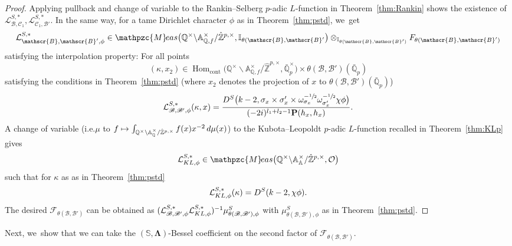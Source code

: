 \documentclass[10pt]{amsart}
\newcommand{\ie}{i.e.}
\newcommand\mto{\mathchoice{\longmapsto}{\mapsto}{\mapsto}{\mapsto}}
\newcommand{\Lfunction}{$L$\nobreakdash-func\-tion\xspace}
\theoremstyle{plain}
\theoremstyle{remark}
\newcommand{\bA}{\mathbb{A}}
\newcommand{\bI}{\mathbb{I}}
\newcommand{\bQ}{\mathbb{Q}}
\newcommand{\bS}{\mathbb{S}}
\newcommand{\bZ}{\mathbb{Z}}
\newcommand{\cF}{\mathcal{F}}
\newcommand{\cL}{\mathcal{L}}
\newcommand{\cO}{\mathcal{O}}
\newcommand{\sB}{\mathscr{B}}
\newcommand{\sC}{\mathscr{C}}
\newcommand{\bfP}{\mathbf{P}}
\newcommand{\Meas}{\mathpzc{M}\mkern-2mu eas}
\newcommand{\cont}{\mathrm{cont}}
\DeclareMathOperator{\Hom}{Hom}
\newcommand{\bLam}{\boldsymbol\Lambda}
\begin{document}
\begin{proof}
Applying pullback and change of variable to the Rankin--Selberg $p$-adic \Lfunction in Theorem~\ref{thm:Rankin} shows the existence of $\cL^{S,*}_{\sB,\sC_1},\cL^{S,\ast}_{\sC_1,\sB'}$. In the same way, for a tame Dirichlet character $\phi$ as in Theorem~\ref{thm:pstd}, we~get
\[
\cL^{S,\ast}_{\sB,\sB',\phi}\in \Meas\bigl(\bQ^\times\backslash \bA^\times_{\bQ,f}/\hat{\bZ}^{p,\times},\bI_{\theta(\sB,\sB'}\bigr)\otimes_{\bI_{\theta(\sB,\sB')}} F_{\theta(\sB,\sB')}
\]
satisfying the interpolation property: For all points
\[
(\kappa,x_2)\in \Hom_\cont\bigl(\bQ^\times\backslash \bA^\times_{\bQ,f}/\hat{\bZ}^{p,\times},\bar{\bQ}^\times_p\bigr)\times \theta(\sB,\sB')(\bar{\bQ}_p)
\]
satisfying the conditions in Theorem~\ref{thm:pstd} (where $x_2$ denotes the projection of $x$ to $ \theta(\sB,\sB')(\bar{\bQ}_p)$)
\begin{align*}
\cL^{S,*}_{\sB,\sB',\phi}(\kappa,x)=\frac{D^S\bigl(k-2,\sigma_{x}\times\sigma'_{x}\times \omega^{-\sfrac{1}{2}}_{\sigma_{x}}\omega^{-\sfrac{1}{2}}_{\sigma'_{x}}\chi\phi\bigr)}{(-2i)^{l_1+l_2-1}\bfP(h_{x},h_{x})}.
\end{align*}
A change of variable (\ie $\mu$ to $f\mto \int_{\bQ^\times\backslash\bA^\times_\bQ/\hat{\bZ}^{p,\times}} f(x)x^{-2}\,d\mu(x)$) to the Kubota--Leopoldt $p$-adic \Lfunction recalled in Theorem~\ref{thm:KLp} gives
\[
\cL^{S,\ast}_{\rm KL,\phi}\in \Meas\bigl(\bQ^\times\backslash\bA^\times_\bA/\hat{\bZ}^{p,\times},\cO\bigr)
\]
such that for $\kappa$ as as in Theorem~\ref{thm:pstd}
\[
\cL^{S,\ast}_{\rm KL,\phi}(\kappa)=D^S(k-2,\chi\phi).
\]
The desired $\cF_{\theta(\sB,\sB')}$ can be obtained as $(\cL^{S,\ast}_{\sB,\sB',\phi}\cL^{S,\ast}_{\rm KL,\phi})^{-1} \mu^S_{\theta(\sB,\sB'),\phi}$ with $\mu^S_{\theta(\sB,\sB'),\phi}$ as in Theorem~\ref{thm:pstd}.
\end{proof}

Next, we~show that we can take the $(\bS,\bLam)$-Bessel coefficient on the second factor of $\cF_{\theta(\sB,\sB')}$.
\end{document}
